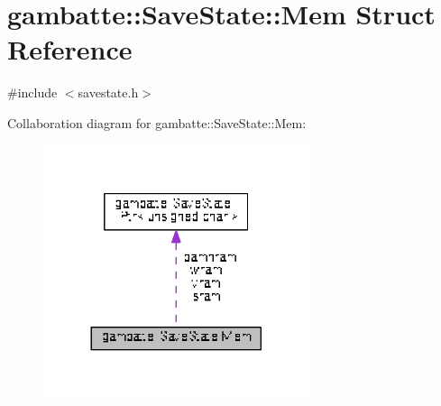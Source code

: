 \hypertarget{structgambatte_1_1SaveState_1_1Mem}{}\section{gambatte\+:\+:Save\+State\+:\+:Mem Struct Reference}
\label{structgambatte_1_1SaveState_1_1Mem}


{\ttfamily \#include $<$savestate.\+h$>$}



Collaboration diagram for gambatte\+:\+:Save\+State\+:\+:Mem\+:\nopagebreak
\begin{figure}[H]
\begin{center}
\leavevmode
\includegraphics[width=221pt]{structgambatte_1_1SaveState_1_1Mem__coll__graph}
\end{center}
\end{figure}
